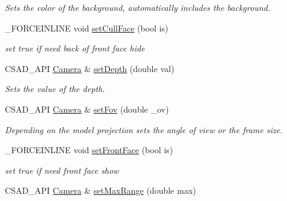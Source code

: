 \begin{DoxyCompactItemize}
\begin{DoxyCompactList}\small\item\em Sets the color of the background, automatically includes the background. \end{DoxyCompactList}\item 
\hypertarget{classcsad_1_1_camera_ad56a98a01c19be324ed7e9f6dc94b88c}{\-\_\-\-F\-O\-R\-C\-E\-I\-N\-L\-I\-N\-E void \hyperlink{classcsad_1_1_camera_ad56a98a01c19be324ed7e9f6dc94b88c}{set\-Cull\-Face} (bool is)}\label{classcsad_1_1_camera_ad56a98a01c19be324ed7e9f6dc94b88c}

\begin{DoxyCompactList}\small\item\em set true if need back of front face hide \end{DoxyCompactList}\item 
\hypertarget{classcsad_1_1_camera_a59f0490c8eef4fe181ecdb19f59640bb}{C\-S\-A\-D\-\_\-\-A\-P\-I \hyperlink{classcsad_1_1_camera}{Camera} \& \hyperlink{classcsad_1_1_camera_a59f0490c8eef4fe181ecdb19f59640bb}{set\-Depth} (double val)}\label{classcsad_1_1_camera_a59f0490c8eef4fe181ecdb19f59640bb}

\begin{DoxyCompactList}\small\item\em Sets the value of the depth. \end{DoxyCompactList}\item 
\hypertarget{classcsad_1_1_camera_a06aab87cdd1c891cf02918adcff10d96}{C\-S\-A\-D\-\_\-\-A\-P\-I \hyperlink{classcsad_1_1_camera}{Camera} \& \hyperlink{classcsad_1_1_camera_a06aab87cdd1c891cf02918adcff10d96}{set\-Fov} (double \-\_\-ov)}\label{classcsad_1_1_camera_a06aab87cdd1c891cf02918adcff10d96}

\begin{DoxyCompactList}\small\item\em Depending on the model projection sets the angle of view or the frame size. \end{DoxyCompactList}\item 
\hypertarget{classcsad_1_1_camera_aa65e2c0df44a14cc545fedfbd010baba}{\-\_\-\-F\-O\-R\-C\-E\-I\-N\-L\-I\-N\-E void \hyperlink{classcsad_1_1_camera_aa65e2c0df44a14cc545fedfbd010baba}{set\-Front\-Face} (bool is)}\label{classcsad_1_1_camera_aa65e2c0df44a14cc545fedfbd010baba}

\begin{DoxyCompactList}\small\item\em set true if need front face show \end{DoxyCompactList}\item 
\hypertarget{classcsad_1_1_camera_a493003b12fbba2386cba0a98ee827a40}{C\-S\-A\-D\-\_\-\-A\-P\-I \hyperlink{classcsad_1_1_camera}{Camera} \& \hyperlink{classcsad_1_1_camera_a493003b12fbba2386cba0a98ee827a40}{set\-Max\-Range} (double max)}\label{classcsad_1_1_camera_a493003b12fbba2386cba0a98ee827a40}


\end{DoxyCompactItemize}
